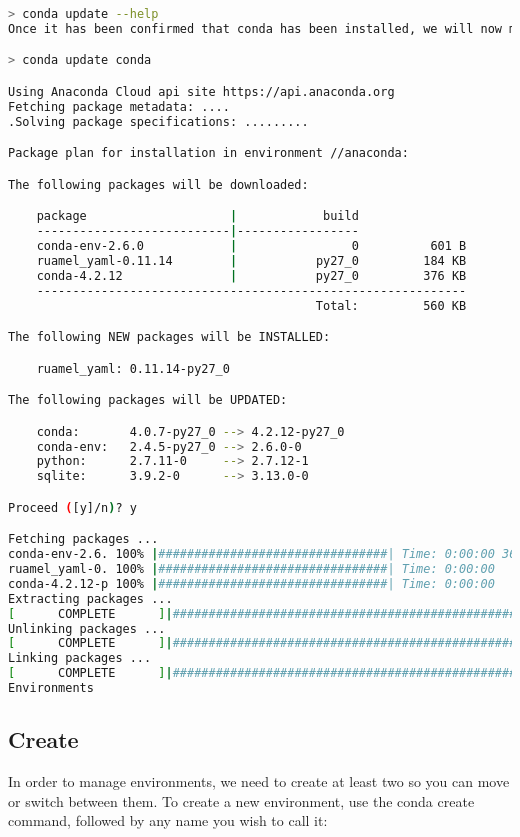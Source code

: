 \begin{lstlisting}[language=bash]
> conda update --help
Once it has been confirmed that conda has been installed, we will now make sure that it is up to date.

> conda update conda

Using Anaconda Cloud api site https://api.anaconda.org
Fetching package metadata: ....
.Solving package specifications: .........

Package plan for installation in environment //anaconda:

The following packages will be downloaded:

    package                    |            build
    ---------------------------|-----------------
    conda-env-2.6.0            |                0          601 B
    ruamel_yaml-0.11.14        |           py27_0         184 KB
    conda-4.2.12               |           py27_0         376 KB
    ------------------------------------------------------------
                                           Total:         560 KB

The following NEW packages will be INSTALLED:

    ruamel_yaml: 0.11.14-py27_0

The following packages will be UPDATED:

    conda:       4.0.7-py27_0 --> 4.2.12-py27_0
    conda-env:   2.4.5-py27_0 --> 2.6.0-0
    python:      2.7.11-0     --> 2.7.12-1
    sqlite:      3.9.2-0      --> 3.13.0-0

Proceed ([y]/n)? y

Fetching packages ...
conda-env-2.6. 100% |################################| Time: 0:00:00 360.78 kB/s
ruamel_yaml-0. 100% |################################| Time: 0:00:00   5.53 MB/s
conda-4.2.12-p 100% |################################| Time: 0:00:00   5.84 MB/s
Extracting packages ...
[      COMPLETE      ]|###################################################| 100%
Unlinking packages ...
[      COMPLETE      ]|###################################################| 100%
Linking packages ...
[      COMPLETE      ]|###################################################| 100%
Environments
\end{lstlisting}



\subsection{Create}

In order to manage environments, we need to create at least two so you can move or switch between them. To create a new environment, use the conda create command, followed by any name you wish to call it:

